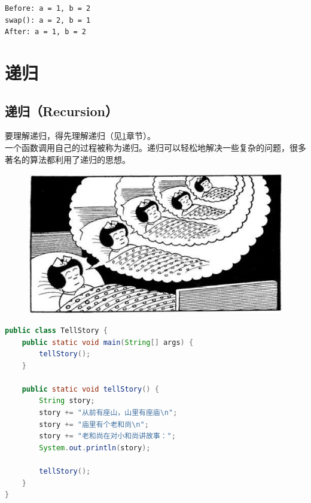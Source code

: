 \begin{tcolorbox}
	\begin{verbatim}
Before: a = 1, b = 2
swap(): a = 2, b = 1
After: a = 1, b = 2
	\end{verbatim}
\end{tcolorbox}

\newpage

\section{递归} \label{recursion}

\subsection{递归（Recursion）}

要理解递归，得先理解递归（见\ref{recursion}章节）。\\

一个函数调用自己的过程被称为递归。递归可以轻松地解决一些复杂的问题，很多著名的算法都利用了递归的思想。

\begin{figure}[H]
	\centering
	\includegraphics[scale=0.7]{img/Chapter5/5-3/1.png}
\end{figure}

\vspace{0.5cm}


\begin{lstlisting}[language=Java]
public class TellStory {
	public static void main(String[] args) {
		tellStory();
	}

	public static void tellStory() {
		String story;
		story += "从前有座山，山里有座庙\n";
		story += "庙里有个老和尚\n";
		story += "老和尚在对小和尚讲故事：";
		System.out.println(story);

		tellStory();
	}
}
\end{lstlisting}

